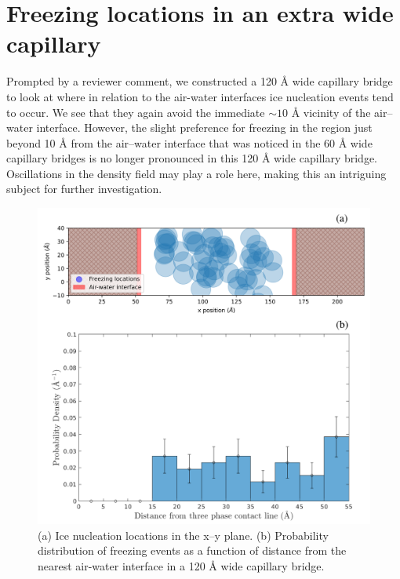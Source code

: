 \documentclass[journal abbreviation, manuscript]{copernicus}
\begin{document}
\section{Freezing locations in an extra wide capillary}\label{app: capillary} 
Prompted by a reviewer comment, we constructed a 120 \AA{} wide capillary bridge to look at where in relation to the air-water interfaces ice nucleation events tend to occur. We see that they again avoid the immediate $\sim 10$ \AA{} vicinity of the air--water interface. However, the slight preference for freezing in the region just beyond 10 \AA{} from the air--water interface that was noticed in the 60 \AA{} wide capillary bridges is no longer pronounced in this 120 \AA{} wide capillary bridge. Oscillations in the density field may play a role here, making this an intriguing subject for further investigation.

\begin{figure}[t]
\includegraphics[width=12cm]{figures/appendix_freezing_distributions.png}
\caption{(a) Ice nucleation locations in the x--y plane. (b) Probability distribution of freezing events as a function of distance from the nearest air-water interface in a 120 \AA{} wide capillary bridge.}
\label{fig:appendix}
\end{figure}

\end{document}
